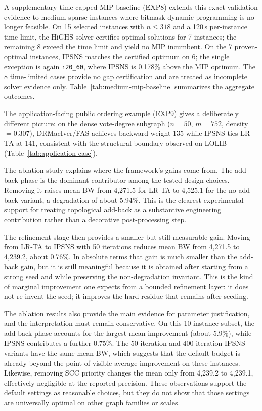 A supplementary time-capped MIP baseline (EXP8) extends this exact-validation evidence to medium sparse instances where bitmask dynamic programming is no longer feasible. On 15 selected instances with $n \le 318$ and a 120\,s per-instance time limit, the HiGHS solver certifies optimal solutions for 7 instances; the remaining 8 exceed the time limit and yield no MIP incumbent. On the 7 proven-optimal instances, IPSNS matches the certified optimum on 6; the single exception is again \texttt{r20\_60}, where IPSNS is 0.178\% above the MIP optimum. The 8 time-limited cases provide no gap certification and are treated as incomplete solver evidence only. Table~\ref{tab:medium-mip-baseline} summarizes the aggregate outcomes.



The application-facing public ordering example (EXP9) gives a deliberately different picture: on the dense vote-degree subgraph ($n{=}50$, $m{=}752$, density $= 0.307$), DRMacIver/FAS achieves backward weight 135 while IPSNS ties LR-TA at 141, consistent with the structural boundary observed on LOLIB (Table~\ref{tab:application-case}).



The ablation study explains where the framework's gains come from. The add-back phase is the dominant contributor among the tested design choices. Removing it raises mean BW from 4,271.5 for LR-TA to 4,525.1 for the no-add-back variant, a degradation of about 5.94\%. This is the clearest experimental support for treating topological add-back as a substantive engineering contribution rather than a decorative post-processing step.

The refinement stage then provides a smaller but still measurable gain. Moving from LR-TA to IPSNS with 50 iterations reduces mean BW from 4,271.5 to 4,239.2, about 0.76\%. In absolute terms that gain is much smaller than the add-back gain, but it is still meaningful because it is obtained after starting from a strong seed and while preserving the non-degradation invariant. This is the kind of marginal improvement one expects from a bounded refinement layer: it does not re-invent the seed; it improves the hard residue that remains after seeding.

The ablation results also provide the main evidence for parameter justification, and the interpretation must remain conservative. On this 10-instance subset, the add-back phase accounts for the largest mean improvement (about 5.9\%), while IPSNS contributes a further 0.75\%. The 50-iteration and 400-iteration IPSNS variants have the same mean BW, which suggests that the default budget is already beyond the point of visible average improvement on these instances. Likewise, removing SCC priority changes the mean only from 4,239.2 to 4,239.1, effectively negligible at the reported precision. These observations support the default settings as reasonable choices, but they do not show that those settings are universally optimal on other graph families or scales.

